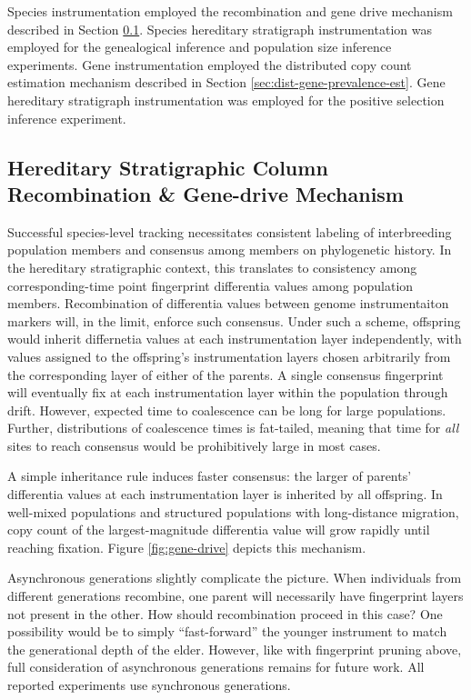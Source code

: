 Species instrumentation employed the recombination and gene drive mechanism described in Section \ref{sec:gene-drive}.
Species hereditary stratigraph instrumentation was employed for the genealogical inference and population size inference experiments.
Gene instrumentation employed the distributed copy count estimation mechanism described in Section \ref{sec:dist-gene-prevalence-est}.
Gene hereditary stratigraph instrumentation was employed for the positive selection inference experiment.

\subsection{Hereditary Stratigraphic Column Recombination \& Gene-drive Mechanism}
\label{sec:gene-drive}



Successful species-level tracking necessitates consistent labeling of interbreeding population members and consensus among members on phylogenetic history.
In the hereditary stratigraphic context, this translates to consistency among corresponding-time point fingerprint differentia values among population members.
Recombination of differentia values between genome instrumentaiton markers will, in the limit, enforce such consensus.
Under such a scheme, offspring would inherit differnetia values at each instrumentation layer independently, with values assigned to the offspring's instrumentation layers chosen arbitrarily from the corresponding layer of either of the parents.
A single consensus fingerprint will eventually fix at each instrumentation layer within the population through drift.
However, expected time to coalescence can be long for large populations.
Further, distributions of coalescence times is fat-tailed, meaning that time for \textit{all} sites to reach consensus would be prohibitively large in most cases.

A simple inheritance rule induces faster consensus: the larger of parents' differentia values at each instrumentation layer is inherited by all offspring.
In well-mixed populations and structured populations with long-distance migration, copy count of the largest-magnitude differentia value will grow rapidly until reaching fixation.
Figure \ref{fig:gene-drive} depicts this mechanism.

Asynchronous generations slightly complicate the picture.
When individuals from different generations recombine, one parent will necessarily have fingerprint layers not present in the other.
How should recombination proceed in this case?
One possibility would be to simply ``fast-forward'' the younger instrument to match the generational depth of the elder.
However, like with fingerprint pruning above, full consideration of asynchronous generations remains for future work.
All reported experiments use synchronous generations.

